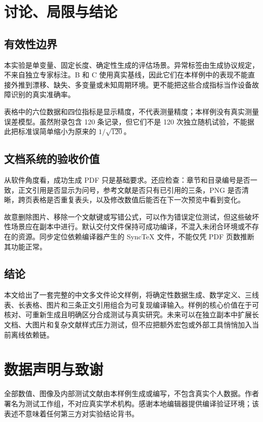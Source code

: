 \section{讨论、局限与结论}
\label{sec:discussion}
\subsection{有效性边界}
本实验是单变量、固定长度、确定性生成的评估场景。异常标签由生成协议规定，不来自独立专家标注。B 和 C 使用真实基线，因此它们在本样例中的表现不能直接外推到漂移、缺失、多变量或未知周期环境。更不能把这些合成指标当作设备故障识别的真实准确率。

表格中的六位数据和四位指标是显示精度，不代表测量精度；本样例没有真实测量误差模型。虽然附录包含 120 条记录，但它们不是 120 次独立随机试验，不能据此把标准误简单缩小为原来的 $1/\sqrt{120}$。

\subsection{文档系统的验收价值}
从软件角度看，成功生成 PDF 只是基础要求。还应检查：章节和目录编号是否一致，正文引用是否显示为问号，参考文献是否只有已引用的三条，PNG 是否清晰，跨页表格是否重复表头，以及修改数值后能否在下一次预览中看到变化。

故意删除图片、移除一个文献键或写错公式，可以作为错误定位测试，但这些破坏性场景应在副本中进行。默认交付文件保持可成功编译，不混入未闭合环境或不存在的资源。同步定位依赖编译器产生的 SyncTeX 文件，不能仅凭 PDF 页数推断其功能正常。

\subsection{结论}
本文给出了一套完整的中文多文件论文样例，将确定性数据生成、数学定义、三线表、长表格、图片和三条正文引用组合为可复现编译输入。样例的核心价值在于可核对、可重新生成且明确区分合成测试与真实研究。未来可以在独立副本中扩展长文档、大图片和复杂文献样式压力测试，但不应把额外宏包或外部工具悄悄加入当前离线依赖链。

\section*{数据声明与致谢}
全部数值、图像及内部测试文献由本样例生成或编写，不包含真实个人数据。作者署名为测试工作组，不对应真实学术机构。感谢本地编辑器提供编译验证环境；该表述不意味着任何第三方对实验结论背书。
